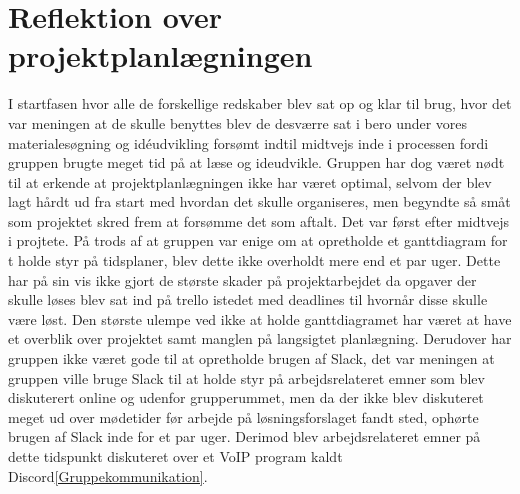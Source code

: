 \section{Reflektion over projektplanlægningen}\label{Reflektion-over-projektplanlaegningen}
I startfasen hvor alle de forskellige redskaber blev sat op og klar til brug, hvor det var meningen at de skulle benyttes blev de desværre sat i bero under vores materialesøgning og idéudvikling forsømt indtil midtvejs inde i processen fordi gruppen brugte meget tid på at læse og ideudvikle. Gruppen har dog været nødt til at erkende at projektplanlægningen ikke har været optimal, selvom der blev lagt hårdt ud fra start med hvordan det skulle organiseres, men begyndte så småt som projektet skred frem at forsømme det som aftalt. Det var først efter midtvejs i projtete. På trods af at gruppen var enige om at opretholde et ganttdiagram for t holde styr på tidsplaner, blev dette ikke overholdt mere end et par uger. Dette har på sin vis ikke gjort de største skader på projektarbejdet da opgaver der skulle løses blev sat ind på trello istedet med deadlines til hvornår disse skulle være løst. Den største ulempe ved ikke at holde ganttdiagramet har været at have et overblik over projektet samt manglen på langsigtet planlægning. Derudover har gruppen ikke været gode til at opretholde brugen af Slack, det var meningen at gruppen ville bruge Slack til at holde styr på arbejdsrelateret emner som blev diskuterert online og udenfor grupperummet, men da der ikke blev diskuteret meget ud over mødetider før arbejde på løsningsforslaget fandt sted, ophørte brugen af Slack inde for et par uger. Derimod blev arbejdsrelateret emner på dette tidspunkt diskuteret over et VoIP program kaldt Discord\ref{Gruppekommunikation}.